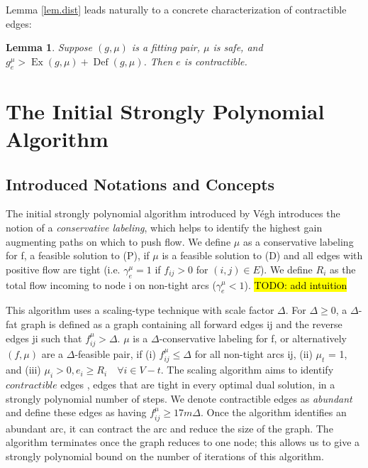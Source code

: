 \documentclass[11pt]{article}
\newtheorem{lemma}[theorem]{Lemma}
\theoremstyle{definition}
\theoremstyle{definition}
\newcommand{\geu}{\gamma_e^{\mu}}
\DeclareMathOperator{\Ex}{Ex}
\DeclareMathOperator{\Def}{Def}
\newcommand{\todo}[1]{\hl{TODO: #1}}
\begin{document}
    Lemma \ref{lem.dist} leads naturally to a concrete characterization of contractible edges:
    \begin{lemma}
    Suppose $(g, \mu)$ is a fitting pair, $\mu$ is safe, and $g^\mu_e > \Ex(g, \mu) + \Def(g, \mu)$.
    Then $e$ is contractible.
    \end{lemma}
	

\section{The Initial Strongly Polynomial Algorithm}
\subsection{Introduced Notations and Concepts}
The initial strongly polynomial algorithm introduced by Végh \cite{Vegh2013} introduces the notion of a \textit{conservative labeling}, which helps to identify the highest gain augmenting paths on which to push flow. We define $\mu$ as a conservative labeling for f, a feasible solution to (P), if $\mu$ is a feasible solution to (D) and all edges with positive flow are tight (i.e. $\geu = 1$ if $f_{ij} > 0$ for $(i, j) \in E$). We define $R_i$ as the total flow incoming to node i on non-tight arcs ($\geu < 1$). \todo{add intuition}

This algorithm uses a scaling-type technique with scale factor $\Delta$. For $\Delta \geq 0$, a $\Delta$-fat graph is defined as a graph containing all forward edges ij and the reverse edges ji such that $f_{ij}^\mu > \Delta$. $\mu$ is a $\Delta$-conservative labeling for f, or alternatively $(f, \mu)$ are a $\Delta$-feasible pair, if (i) $f_{ij}^\mu \leq \Delta$ for all non-tight arcs ij, (ii) $\mu_t$ = 1, and (iii) $\mu_i > 0, e_i \geq R_i \quad \forall i \in V -t$. The scaling algorithm aims to identify $\textit{contractible}$ edges \cite{Orlin1988}, edges that are tight in every optimal dual solution, in a strongly polynomial number of steps. We denote contractible edges as \emph{abundant} and define these edges as having $f_{ij}^\mu \geq 17m\Delta$. Once the algorithm identifies an abundant arc, it can contract the arc and reduce the size of the graph. The algorithm terminates once the graph reduces to one node; this allows us to give a strongly polynomial bound on the number of iterations of this algorithm.
\end{document}
